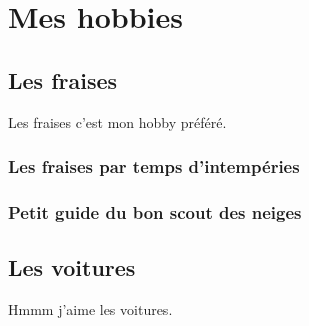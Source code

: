 \documentclass{article}
\begin{document}
\section{Mes hobbies}
\subsection{Les fraises}
Les fraises c'est mon hobby préféré.

\subsubsection{Les fraises par temps d'intempéries}

\subsubsection{Petit guide du bon scout des neiges}

\subsection{Les voitures}
Hmmm j'aime les voitures.
\end{document}
